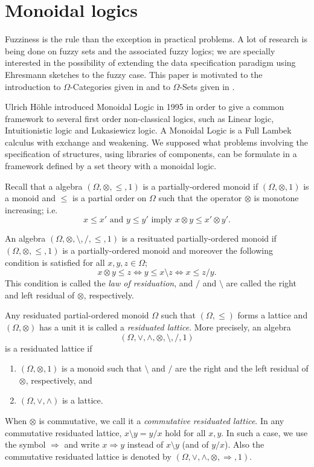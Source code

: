 \documentclass[oribibl]{llncs}
\begin{document}
\section{Monoidal logics}\label{monoidal logics}
Fuzziness is the rule than the exception in practical problems. A lot of research is being done on fuzzy sets and the associated fuzzy logics; we are specially interested in the possibility of extending the data specification paradigm using Ehresmann sketches to the fuzzy case. This paper is motivated to the introduction to $\Omega$-Categories given in \cite{Clementino04} and to $\Omega$-Sets given in \cite{valverde??}.

Ulrich H\"{o}hle introduced Monoidal Logic in 1995 in order to give a common framework to several first order non-classical logics, such as Linear logic, Intuitionistic logic and Lukasiewicz logic. A Monoidal Logic is a Full Lambek calculus with  exchange and weakening. We supposed what problems involving the specification of structures, using libraries of components, can be formulate in a framework defined by a set theory with a monoidal logic.

Recall that a algebra $(\Omega,\otimes,\leq,1)$  is a partially-ordered monoid
if $(\Omega,\otimes,1)$ is a monoid and  $\leq$  is a partial order
on $\Omega$  such that the operator $\otimes$ is monotone
increasing; i.e.
\[ x\leq x' \text{ and } y\leq y' \text{ imply } x\otimes y \leq x'\otimes y'.\]

An algebra $(\Omega,\otimes,\setminus,/,\leq,1)$  is a resituated
partially-ordered monoid if $(\Omega,\otimes,\leq,1)$ is a
partially-ordered monoid and moreover the following condition is
satisfied for all $x,y,z\in \Omega$;
\[ x\otimes y\leq z \Leftrightarrow y\leq x\setminus z \Leftrightarrow x\leq z/y. \]
This condition is called the \emph{law of residuation}, and $/$ and
$\setminus$ are called the right and left residual of $\otimes$,
respectively.

Any residuated partial-ordered monoid $\Omega$  such that
$(\Omega,\leq)$ forms a lattice and $(\Omega,\otimes)$  has a unit
it is called a \emph{residuated lattice}. More precisely, an algebra
\[(\Omega,\vee,\wedge,\otimes,\setminus,/,1)\]  is a residuated
lattice if
\begin{enumerate}
  \item $(\Omega,\otimes,1)$ is a monoid such that $\setminus$ and $/$ are the right and the left residual
of  $\otimes$, respectively, and
  \item $(\Omega,\vee,\wedge)$ is a lattice.
\end{enumerate}
When $\otimes$ is commutative, we call it a \emph{commutative residuated
lattice}. In any commutative residuated lattice, $x\setminus y=y/x$
hold for all $x,y$. In such a case, we use the symbol $\Rightarrow$
and write $x\Rightarrow y$ instead of  $x\setminus y$ (and of
$y/x$). Also the commutative residuated lattice is denoted by
$(\Omega,\vee,\wedge,\otimes,\Rightarrow,1)$.
\end{document}
